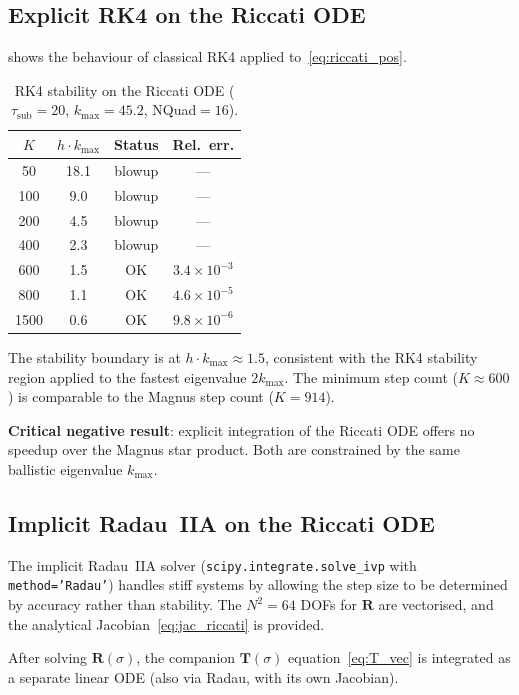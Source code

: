 \documentclass[11pt,a4paper]{article}
\newcommand{\mat}[1]{\mathbf{#1}}
\newcommand{\tsub}{\tau_{\mathrm{sub}}}
\newcommand{\kmax}{k_{\max}}
\theoremstyle{definition}
\begin{document}
\subsection{Explicit RK4 on the Riccati ODE}

 shows the behaviour of classical RK4 applied
to~\eqref{eq:riccati_pos}.

\begin{table}[h]\centering
\caption{RK4 stability on the Riccati ODE ($\tsub=20$,
$\kmax=45.2$, NQuad${}=16$).}\label{tab:rk4}
\begin{tabular}{cccc}
\toprule
$K$ & $h\cdot\kmax$ & Status & Rel.\ err. \\
\midrule
50  & 18.1  & blowup & --- \\
100 & 9.0   & blowup & --- \\
200 & 4.5   & blowup & --- \\
400 & 2.3   & blowup & --- \\
600 & 1.5   & OK & $3.4\times 10^{-3}$ \\
800 & 1.1   & OK & $4.6\times 10^{-5}$ \\
1500 & 0.6  & OK & $9.8\times 10^{-6}$ \\
\bottomrule
\end{tabular}
\end{table}

The stability boundary is at $h\cdot\kmax\approx 1.5$, consistent
with the RK4 stability region applied to the fastest eigenvalue
$2\kmax$.  The minimum step count ($K\approx 600$) is comparable
to the Magnus step count ($K=914$).

\textbf{Critical negative result}: explicit integration of the
Riccati ODE offers no speedup over the Magnus star product.  Both
are constrained by the same ballistic eigenvalue $\kmax$.

\subsection{Implicit Radau~IIA on the Riccati ODE}

The implicit Radau~IIA solver (\texttt{scipy.integrate.solve\_ivp}
with \texttt{method='Radau'}) handles stiff systems by allowing the
step size to be determined by accuracy rather than stability.  The
$N^2=64$ DOFs for $\mat{R}$ are vectorised, and the analytical
Jacobian~\eqref{eq:jac_riccati} is provided.

After solving $\mat{R}(\sigma)$, the companion $\mat{T}(\sigma)$
equation~\eqref{eq:T_vec} is integrated as a separate linear ODE (also
via Radau, with its own Jacobian).
\end{document}
